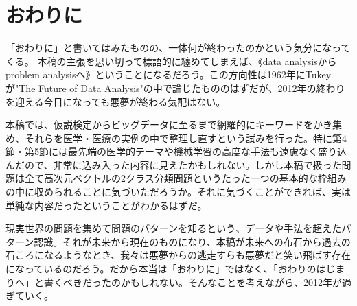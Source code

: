 \section{おわりに}
「おわりに」と書いてはみたものの、一体何が終わったのかという気分になってくる。
本稿の主張を思い切って標語的に纏めてしまえば、《data analysisからproblem analysisへ》ということになるだろう。この方向性は1962年にTukeyが"The Future of Data Analysis"の中で論じたもののはずだが、2012年の終わりを迎える今日になっても悪夢が終わる気配はない。

本稿では、仮説検定からビッグデータに至るまで網羅的にキーワードをかき集め、それらを医学・医療の実例の中で整理し直すという試みを行った。特に第4節・第5節には最先端の医学的テーマや機械学習の高度な手法も遠慮なく盛り込んだので、非常に込み入った内容に見えたかもしれない。しかし本稿で扱った問題は全て高次元ベクトルの2クラス分類問題というたった一つの基本的な枠組みの中に収められることに気づいただろうか。それに気づくことができれば、実は単純な内容だったということがわかるはずだ。

現実世界の問題を集めて問題のパターンを知るという、データや手法を超えたパターン認識。それが未来から現在のものになり、本稿が未来への布石から過去の石ころになるようなとき、我々は悪夢からの逃走すらも悪夢だと笑い飛ばす存在になっているのだろう。だから本当は「おわりに」ではなく、「おわりのはじまりへ」と書くべきだったのかもしれない。そんなことを考えながら、2012年が過ぎていく。




